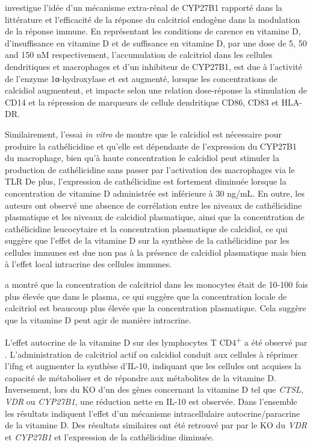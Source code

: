 \documentclass[
  a4paper,
  DIV=11,
  numbers=noendperiod,
  listof=totoc]{scrreprt}
\begin{document}
\textcite{Hewison.2007} investigue l'idée d'un mécanisme extra-rénal de
\ac{CYP27B1} rapporté dans la littérature et l'efficacité de la réponse
du calcitriol endogène dans la modulation de la réponse immune. En
représentant les conditions de carence en vitamine D, d'insuffisance en
vitamine D et de suffisance en vitamine D, par une dose de 5, 50 and 150
nM respectivement, l'accumulation de calcitriol dans les cellules
dendritiques et macrophages et d'un inhibiteur de CYP27B1, est due à
l'activité de l'enzyme 1α-hydroxylase et est augmenté, lorsque les
concentrations de calcidiol augmentent, et impacte selon une relation
dose-réponse la stimulation de CD14 et la répression de marqueurs de
cellule dendritique CD86, CD83 et HLA-DR.

Similairement, l'essai \emph{in vitro} de \textcite{Adams.2009} montre
que le calcidiol est nécessaire pour produire la cathélicidine et
qu'elle est dépendante de l'expression du CYP27B1 du macrophage, bien
qu'à haute concentration le calcidiol peut stimuler la production de
cathélicidine sans passer par l'activation des macrophages via le
\ac{TLR} De plus, l'expression de cathélicidine est fortement diminuée
lorsque la concentration de vitamine D administrée est inférieure à 30
ng/mL. En outre, les auteurs ont observé une absence de corrélation
entre les niveaux de cathélicidine plasmatique et les niveaux de
calcidiol plasmatique, ainsi que la concentration de cathélicidine
leucocytaire et la concentration plasmatique de calcidiol, ce qui
suggère que l'effet de la vitamine D sur la synthèse de la cathélicidine
par les cellules immunes est due non pas à la présence de calcidiol
plasmatique mais bien à l'effet local intracrine des cellules immunes.

\textcite{Chun.2010} a montré que la concentration de calcitriol dans
les monocytes était de 10-100 fois plus élevée que dans le plasma, ce
qui suggère que la concentration locale de calcitriol est beaucoup plus
élevée que la concentration plasmatique. Cela suggère que la vitamine D
peut agir de manière intracrine.

L'effet autocrine de la vitamine D sur des lymphocytes T
CD4\textsuperscript{+} a été observé par \textcite{Chauss.2022}.
L'administration de calcitriol actif ou calcidiol conduit aux cellules à
réprimer l'\ac{ifng} et augmenter la synthèse d'\ac{IL-10}, indiquant
que les cellules ont acquises la capacité de métaboliser et de répondre
aux métabolites de la vitamine D. Inversement, lors du KO d'un des gènes
concernant la vitamine D tel que \emph{CTSL}, \emph{VDR} ou
\emph{CYP27B1}, une réduction nette en \ac{IL-10} est observée. Dans
l'ensemble les résultats indiquent l'effet d'un mécanisme
intracellulaire autocrine/paracrine de la vitamine D. Des résultats
similaires ont été retrouvé par \textcite{Adams.2009} par le KO du
\emph{VDR} et \emph{CYP27B1} et l'expression de la cathélicidine
diminuée.
\end{document}
